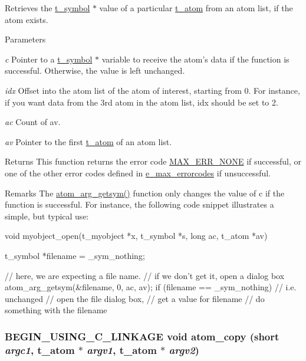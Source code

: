 Retrieves the \hyperlink{structt__symbol}{t\_\-symbol} $\ast$ value of a particular \hyperlink{structt__atom}{t\_\-atom} from an atom list, if the atom exists. 
\begin{DoxyParams}{Parameters}
\item[{\em c}]Pointer to a \hyperlink{structt__symbol}{t\_\-symbol} $\ast$ variable to receive the atom's data if the function is successful. Otherwise, the value is left unchanged. \item[{\em idx}]Offset into the atom list of the atom of interest, starting from 0. For instance, if you want data from the 3rd atom in the atom list, {\ttfamily idx} should be set to 2. \item[{\em ac}]Count of av. \item[{\em av}]Pointer to the first \hyperlink{structt__atom}{t\_\-atom} of an atom list.\end{DoxyParams}
\begin{DoxyReturn}{Returns}
This function returns the error code \hyperlink{group__misc_gga0764dd6c02b76cca7d053ae50555d69da6d22f77fef8b1e1b074cef5d29d935fd}{MAX\_\-ERR\_\-NONE} if successful, or one of the other error codes defined in \hyperlink{group__misc_ga0764dd6c02b76cca7d053ae50555d69d}{e\_\-max\_\-errorcodes} if unsuccessful.
\end{DoxyReturn}
\begin{DoxyRemark}{Remarks}
The \hyperlink{group__atom_gaeba7a400021327a46673220ef1c1ee98}{atom\_\-arg\_\-getsym()} function only changes the value of {\ttfamily c} if the function is successful. For instance, the following code snippet illustrates a simple, but typical use: 
\begin{DoxyCode}
    void myobject_open(t_myobject *x, t_symbol *s, long ac, t_atom *av)
    {
        t_symbol *filename = _sym_nothing;

        // here, we are expecting a file name.
        // if we don't get it, open a dialog box 
        atom_arg_getsym(&filename, 0, ac, av);
        if (filename == _sym_nothing) { // i.e. unchanged
            // open the file dialog box,
            // get a value for filename
        }
        // do something with the filename
    }
\end{DoxyCode}
 
\end{DoxyRemark}
\hypertarget{group__atom_ga34f9b920bed69c19988fe70d7be79c18}{
\subsubsection[{atom\_\-copy}]{\setlength{\rightskip}{0pt plus 5cm}BEGIN\_\-USING\_\-C\_\-LINKAGE void atom\_\-copy (short {\em argc1}, \/  {\bf t\_\-atom} $\ast$ {\em argv1}, \/  {\bf t\_\-atom} $\ast$ {\em argv2})}}
\label{group__atom_ga34f9b920bed69c19988fe70d7be79c18}


